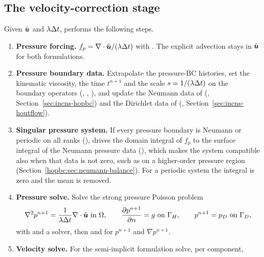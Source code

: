 \subsection{The velocity-correction stage}
\label{sec:incns-vcs}

Given $\hat{\boldsymbol{u}}$ and $\lambda\Delta t$,
 performs the following steps.

\begin{enumerate}
  \item \textbf{Pressure forcing.} $f_p=\nabla\cdot\hat{\boldsymbol{u}}/(\lambda
  \Delta t)$ with . The explicit advection stays in
  $\hat{\boldsymbol{u}}$ for both formulations.
  \item \textbf{Pressure boundary data.} Extrapolate the pressure-BC
  histories, set the kinematic viscosity, the time $t^{n+1}$ and the scale
  $s=1/(\lambda\Delta t)$ on the boundary operators (,
  , ), and update the Neumann data of
   (,
  Section~\ref{sec:incns-hopbc}) and the Dirichlet data of
   (,
  Section~\ref{sec:incns-houtflow}).
  \item \textbf{Singular pressure system.} If every pressure boundary is
  Neumann or periodic on all ranks (),
   drives the domain integral of $f_p$ to the surface
  integral of the Neumann pressure data
  (), which makes the system
  compatible also when that data is not zero, such as on a higher-order
  pressure region (Section~\ref{hopbc:sec:neumann-balance}). For a periodic
  system the integral is zero and the mean is removed.
  \item \textbf{Pressure solve.} Solve the strong pressure Poisson problem
  \begin{equation}
    \nabla^2p^{n+1}=\frac{1}{\lambda\Delta t}\nabla\cdot\hat{\boldsymbol{u}}
    \ \text{in }\Omega,\qquad
    \frac{\partial p^{n+1}}{\partial n}=g\ \text{on }\Gamma_H,\qquad
    p^{n+1}=p_D\ \text{on }\Gamma_D,
    \label{eq:incns-poisson}
  \end{equation}
  with  and a  solver, then
   and  for $p^{n+1}$ and $\nabla
  p^{n+1}$.
  \item \textbf{Velocity solve.} For the semi-implicit formulation solve, per
  component,
  \begin{equation}

\end{equation}
\end{enumerate}
